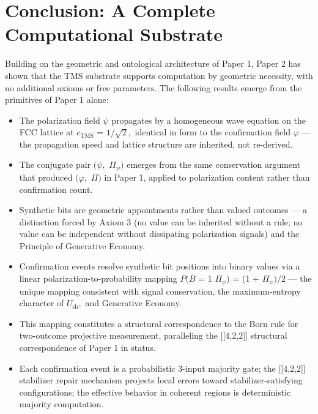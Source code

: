 \documentclass[11pt,oneside]{report}
\theoremstyle{definition}
\theoremstyle{remark}
\begin{document}
\section*{Conclusion: A Complete Computational Substrate}

Building on the geometric and ontological architecture of Paper 1, Paper
2 has shown that the TMS substrate supports computation by geometric
necessity, with no additional axioms or free parameters. The following
results emerge from the primitives of Paper 1 alone:

\begin{itemize}
\item
  The polarization field \ensuremath{\psi} propagates by a homogeneous wave equation on
  the FCC lattice at \ensuremath{c_{\mathrm{TMS}}} = \ensuremath{1/\sqrt{2},} identical in form to the confirmation
  field \ensuremath{\varphi} --- the propagation speed and lattice structure are inherited,
  not re-derived.
\item
  The conjugate pair \ensuremath{(\psi ,} \ensuremath{\Pi_{\psi})} emerges from the same conservation
  argument that produced \ensuremath{(\varphi ,} \ensuremath{\Pi )} in Paper 1, applied to polarization
  content rather than confirmation count.
\item
  Synthetic bits are geometric appointments rather than valued outcomes
  --- a distinction forced by Axiom 3 (no value can be inherited without
  a rule; no value can be independent without dissipating polarization
  signals) and the Principle of Generative Economy.
\item
  Confirmation events resolve synthetic bit positions into binary values
  via a linear polarization-to-probability mapping \ensuremath{P(\bar{B}} = 1 \textbar{}
  \ensuremath{\Pi_{\psi})} = (1 + \ensuremath{\Pi_{\psi})/2} --- the unique mapping consistent with signal
  conservation, the maximum-entropy character of \ensuremath{U_{\mathrm{sh}},} and Generative
  Economy.
\item
  This mapping constitutes a structural correspondence to the Born rule
  for two-outcome projective measurement, paralleling the
  [[4,2,2]] structural correspondence of Paper 1 in status.
\item
  Each confirmation event is a probabilistic 3-input majority gate; the
  [[4,2,2]] stabilizer repair mechanism projects local errors
  toward stabilizer-satisfying configurations; the effective behavior in
  coherent regions is deterministic majority computation.

\end{itemize}
\end{document}
